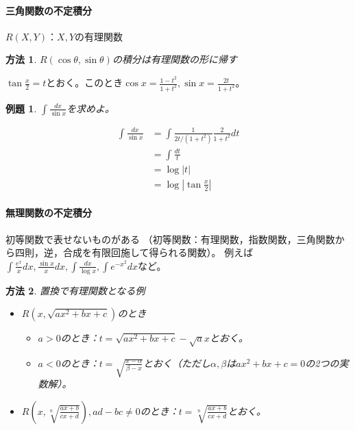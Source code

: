 \documentclass[dvipdfmx,a4j,10pt]{jsarticle}
\makeatletter
\theoremstyle{mystyle1}
\newtheorem{ex}[dfn]{例題}
\theoremstyle{mystyle2}
\newtheorem{ans}{解答}
\newtheorem{way*}{方法}
\renewenvironment{ans}[1][解答]{\par
  \pushQED{\qed}%
  \normalfont
  \topsep6\p@\@plus6\p@ \trivlist
  \item[\hskip\labelsep{\bfseries\sffamily #1}]\ignorespaces
}{%
  \popQED\endtrivlist\@endpefalse
}
\makeatother
\begin{document}
\newpage

\paragraph{三角関数の不定積分}
$R(X,Y)$：$X,Y$の有理関数
\begin{way*}
    $R(\cos\theta,\sin\theta)$の積分は有理関数の形に帰す
\end{way*}
$\displaystyle\tan{\frac{x}{2}}=t$とおく。このとき$\displaystyle\cos{x}=\frac{1-t^2}{1+t^2},\sin{x}=\frac{2t}{1+t^2}$。

\begin{shaded}
    \begin{ex}\label{ex9.5}
        $\displaystyle\int\frac{dx}{\sin{x}}$を求めよ。
    \end{ex}
\end{shaded}

\begin{ans}[解答\ref{ex9.5}]
    \[
    \begin{split}
    \int\frac{dx}{\sin{x}}
    &=\int\frac{1}{2t/(1+t^2)}\frac{2}{1+t^2}dt\\
    &=\int\frac{dt}{t}\\
    &=\log{|t|}\\
    &=\log{\left|\tan{\frac{x}{2}}\right|}
    \end{split}
    \]
\end{ans}

\newpage

\paragraph{無理関数の不定積分}

初等関数で表せないものがある
（初等関数：有理関数，指数関数，三角関数から四則，逆，合成を有限回施して得られる関数）。
例えば$\displaystyle \int\frac{e^x}{x}dx,\frac{\sin{x}}{x}dx,\int\frac{dx}{\log{x}},\int e^{-x^2}dx$など。

\begin{way*}
    置換で有理関数となる例
    \begin{itemize}
        \item
        $R(x,\sqrt{ax^2+bx+c})$のとき
        \begin{itemize}
            \item $a>0$のとき：$t=\sqrt{ax^2+bx+c}-\sqrt{a}x$とおく。
            \item $a<0$のとき：$\displaystyle t=\sqrt{\frac{x-\alpha}{\beta-x}}$とおく（ただし$\alpha,\beta$は$ax^2+bx+c=0$の2つの実数解）。
        \end{itemize}
        \item
        $\displaystyle R\left(x,\sqrt[n]{\frac{ax+b}{cx+d}}\right),ad-bc\neq0$のとき：$\displaystyle t=\sqrt[n]{\frac{ax+b}{cx+d}}$とおく。
    \end{itemize}
\end{way*}
\end{document}
